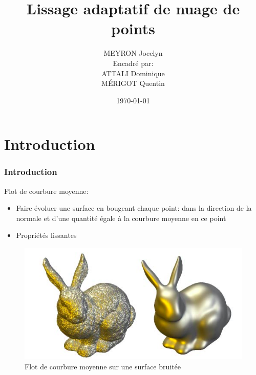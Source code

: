 \documentclass{beamer}
\title[Lissage adaptatif de nuage de points]{Lissage adaptatif de nuage de
    points}
\author[MEYRON Jocelyn]{MEYRON Jocelyn\\\scriptsize{Encadré par:\\ATTALI Dominique\\MÉRIGOT
    Quentin}}
\institute{GIPSA-lab}
\date{\today}
\begin{document}
\begin{frame}
    \titlepage
\end{frame}

\begin{frame}
    \tableofcontents
\end{frame}

\section{Introduction}

\begin{frame}
    \frametitle{Introduction}

    Flot de courbure moyenne:
    \begin{itemize}
        \item Faire évoluer une surface en bougeant chaque point: dans la
            direction de la normale et d'une quantité égale à la courbure
            moyenne en ce point
        \item Propriétés lissantes
    \end{itemize}

    \begin{figure}
        \centering
        \includegraphics[scale=0.27]{img/mean-curvature-flow-rabbit}
        \caption{Flot de courbure moyenne sur une surface bruitée}
    \end{figure}
\end{frame}
\end{document}
